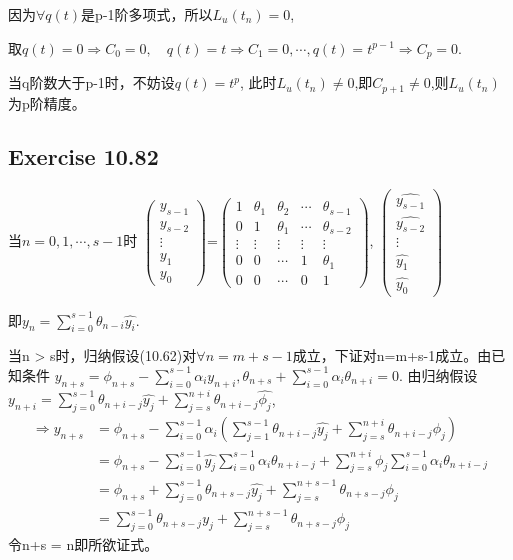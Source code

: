 \documentclass[UTF8]{ctexart}
\begin{document}
因为$\forall q(t)$是p-1阶多项式，所以$L_u(t_n) = 0$, 

取$q(t) = 0 \Rightarrow C_0 = 0,\quad q(t) = t \Rightarrow C_1 = 0,\cdots,q(t) = t^{p-1}\Rightarrow C_{p} = 0$.

当q阶数大于p-1时，不妨设$q(t) = t^p$, 此时$L_u(t_n) \neq 0$,即$C_{p+1} \neq 0$,则$L_u(t_n)$为p阶精度。

\subsection*{Exercise 10.82}
当$n = 0,1,\cdots,s-1时$
$
\begin{pmatrix}
    y_{s-1} \\
    y_{s-2} \\
    \vdots \\
    y_1 \\
    y_0
\end{pmatrix}
$=$\begin{pmatrix}
    1 &\theta_1 &\theta_2 &\cdots &\theta_{s-1} \\
    0 &1 &\theta_1 &\cdots &\theta_{s-2} \\
    \vdots &\vdots &\vdots &\vdots &\vdots \\
    0 &0 &\cdots &1 &\theta_1\\
    0 &0 &\cdots &0 &1 
\end{pmatrix}$,
$\begin{pmatrix}
    \hat{y_{s-1}} \\
    \hat{y_{s-2}} \\
    \vdots \\
    \hat{y_1} \\
    \hat{y_0}
\end{pmatrix}$

即$y_n = \sum_{i = 0}^{s-1}\theta_{n-i}\hat{y_i}$.

当n > s时，归纳假设(10.62)对$\forall n =  m+s-1$成立，下证对n=m+s-1成立。由已知条件
$y_{n+s} = \phi_{n+s} - \sum_{i = 0}^{s-1}\alpha_iy_{n+i}, \theta_{n+s} + \sum_{i = 0}^{s-1}\alpha_i\theta_{n+i} = 0$.
由归纳假设$y_{n+i} = \sum_{j = 0}^{s-1}\theta_{n+i-j}\hat{y_j} + \sum_{j = s}^{n+i}\theta_{n+i-j}\hat{\phi_j}$,
\begin{align*}
    \Rightarrow y_{n+s} &= \phi_{n+s} - \sum_{i = 0}^{s-1}\alpha_i(\sum_{j = 1}^{s-1}\theta_{n+i-j}\hat{y_j}
                         + \sum_{j=s}^{n+i}\theta_{n+i-j}\phi_j) \\
                        &= \phi_{n+s} - \sum_{i = 0}^{s-1} \hat{y_j}\sum_{i=0}^{s-1}\alpha_i\theta_{n+i-j}
                         + \sum_{j=s}^{n+i}\phi_j\sum_{i = 0}^{s-1}\alpha_i\theta_{n+i-j} \\
                        &= \phi_{n+s} + \sum_{j=0}^{s-1}\theta_{n+s-j}\hat{y_j} + \sum_{j=s}^{n+s-1}\theta_{n+s-j}\phi_j \\
                        &= \sum_{j=0}^{s-1}\theta_{n+s-j}\hat{y_j} + \sum_{j=s}^{n+s-1}\theta_{n+s-j}\phi_j
\end{align*}
令n+s = n即所欲证式。
\end{document}
